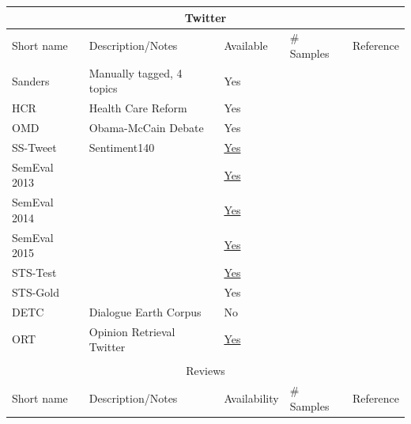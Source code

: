 

\begin{tabular}{l | l | l | l | l}
  \multicolumn{5}{c}{Twitter}\\
  \hline
  Short name & Description/Notes & Available & \# Samples & Reference\\
  \hline
  Sanders           & Manually tagged, 4 topics & Yes & & \cite{giachanou2016like}\\
  HCR                 & Health Care Reform & Yes & & \cite{giachanou2016like}\\ %
  OMD                & Obama-McCain Debate  & Yes & & \cite{giachanou2016like}\\ %
  SS-Tweet         & Sentiment140 & \href{http://help.sentiment140.com/for-students}{Yes} & & \cite{giachanou2016like} \\ %
  SemEval 2013 & & \href{https://www.cs.york.ac.uk/semeval-2013/}{Yes} & & \cite{giachanou2016like} \\ %
  SemEval 2014 & & \href{http://alt.qcri.org/semeval2014/task9/}{Yes}  & & \cite{giachanou2016like} \\ %
  SemEval 2015 & & \href{http://alt.qcri.org/semeval2015/task10/index.php?id=data-and-tools}{Yes}  & & \cite{giachanou2016like} \\ %
  STS-Test         & & \href{http://help.sentiment140.com/for-students}{Yes} & & \cite{giachanou2016like,saif2013evaluation}  \\
  STS-Gold         & & Yes & & \cite{saif2013evaluation}\\ %
  DETC               & Dialogue Earth Corpus & No & & \cite{giachanou2016like} \\ %
  ORT                 & Opinion Retrieval Twitter & \href{https://sourceforge.net/projects/ortwitter/}{Yes} & & \cite{luo2012opinion} \\ %
  \hline
  \multicolumn{5}{c}{}\\
  \multicolumn{5}{c}{Reviews}\\
  \hline
  Short name & Description/Notes & Availability & \# Samples & Reference
\end{tabular}

